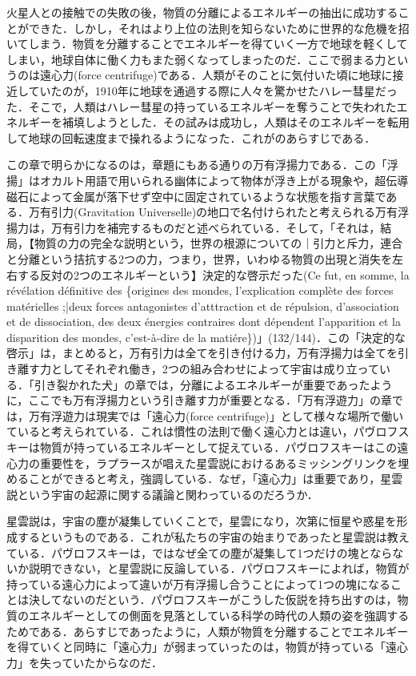 火星人との接触での失敗の後，物質の分離によるエネルギーの抽出に成功することができた．しかし，それはより上位の法則を知らないために世界的な危機を招いてしまう．物質を分離することでエネルギーを得ていく一方で地球を軽くしてしまい，地球自体に働く力もまた弱くなってしまったのだ．ここで弱まる力というのは遠心力(force centrifuge)である．人類がそのことに気付いた頃に地球に接近していたのが，1910年に地球を通過する際に人々を驚かせたハレー彗星だった．そこで，人類はハレー彗星の持っているエネルギーを奪うことで失われたエネルギーを補填しようとした．その試みは成功し，人類はそのエネルギーを転用して地球の回転速度まで操れるようになった．これがのあらすじである．

この章で明らかになるのは，章題にもある通りの万有浮揚力である．この「浮揚」はオカルト用語で用いられる幽体によって物体が浮き上がる現象や，超伝導磁石によって金属が落下せず空中に固定されているような状態を指す言葉である．万有引力(Gravitation Universelle)の地口で名付けられたと考えられる万有浮揚力は，万有引力を補完するものだと述べられている．そして，「それは，結局，【物質の力の完全な説明という，世界の根源についての｜引力と斥力，連合と分離という拮抗する2つの力，つまり，世界，いわゆる物質の出現と消失を左右する反対の2つのエネルギーという】決定的な啓示だった(Ce fut, en somme, la révélation définitive des \{origines des mondes, l'explication complète des forces matérielles ;|deux forces antagonistes d'atttraction et de répulsion, d'association et de dissociation, des deux énergies contraires dont dépendent l'apparition et la disparition des mondes, c'est-à-dire de la matiére\})」(132/144)．この「決定的な啓示」は，まとめると，万有引力は全てを引き付ける力，万有浮揚力は全てを引き離す力としてそれぞれ働き，2つの組み合わせによって宇宙は成り立っている．「引き裂かれた犬」の章では，分離によるエネルギーが重要であったように，ここでも万有浮揚力という引き離す力が重要となる．「万有浮遊力」の章では，万有浮遊力は現実では「遠心力(force centrifuge)」として様々な場所で働いていると考えられている．これは慣性の法則で働く遠心力とは違い，パヴロフスキーは物質が持っているエネルギーとして捉えている．パヴロフスキーはこの遠心力の重要性を，ラプラースが唱えた星雲説におけるあるミッシングリンクを埋めることができると考え，強調している．なぜ，「遠心力」は重要であり，星雲説という宇宙の起源に関する議論と関わっているのだろうか．

星雲説は，宇宙の塵が凝集していくことで，星雲になり，次第に恒星や惑星を形成するというものである．これが私たちの宇宙の始まりであったと星雲説は教えている．パヴロフスキーは，ではなぜ全ての塵が凝集して1つだけの塊とならないか説明できない，と星雲説に反論している．パヴロフスキーによれば，物質が持っている遠心力によって違いが万有浮揚し合うことによって1つの塊になることは決してないのだという．パヴロフスキーがこうした仮説を持ち出すのは，物質のエネルギーとしての側面を見落としている科学の時代の人類の姿を強調するためである．あらすじであったように，人類が物質を分離することでエネルギーを得ていくと同時に「遠心力」が弱まっていったのは，物質が持っている「遠心力」を失っていたからなのだ．

